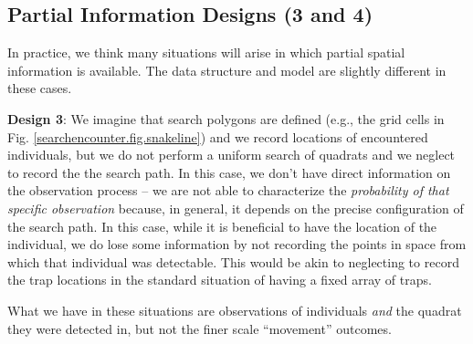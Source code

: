 
\subsection{Partial Information Designs (3 and 4)}

In practice, we think many situations will arise in which partial
spatial information is available. The data structure and model are
slightly different in these cases.

{\bf Design 3}: We imagine that search polygons are defined
(e.g., the grid cells in Fig. \ref{searchencounter.fig.snakeline}) and
we record
locations of encountered individuals, but we do not perform a uniform search
of quadrats and we neglect to record the the search path. 
In this case, we don't have direct information on the observation
process -- we are not able to characterize the {\it probability of
  that specific observation} because, in general, it depends on the
precise configuration of the search path.  In this case, while it is
beneficial to have the location of the individual, we do lose some
information by not recording the points in space from which that
individual was detectable. This would be akin to neglecting to record
the trap locations in the standard situation of having a fixed array
of traps. 

What we have in these situations are
observations of individuals {\it and} the quadrat they were detected in,
but not the finer
scale ``movement'' outcomes.


